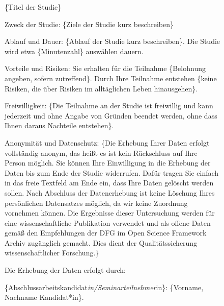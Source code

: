 \documentclass[
  letterpaper,
  DIV=11]{scrreprt}
\begin{document}
\begin{figure}

\hspace{0pt}\hspace{0pt}\{Titel der Studie\}

Zweck der Studie: \{Ziele der Studie kurz beschreiben\}

Ablauf und Dauer: \hspace{0pt}\{Ablauf der Studie kurz
beschreiben\}\hspace{0pt}. Die Studie wird etwa
\hspace{0pt}\{Minutenzahl\} auswählen\hspace{0pt} dauern.

Vorteile und Risiken: Sie erhalten für die Teilnahme
\hspace{0pt}\hspace{0pt}\{Belohnung angeben, sofern zutreffend\}.
\hspace{0pt}Durch Ihre Teilnahme entstehen \{keine Risiken, die über
Risiken im alltäglichen Leben hinausgehen\}.

Freiwilligkeit: \{Die Teilnahme an der Studie ist freiwillig und kann
jederzeit und ohne Angabe von Gründen beendet werden, ohne dass Ihnen
daraus Nachteile entstehen\}.

Anonymität und Datenschutz: \{Die Erhebung Ihrer Daten erfolgt
vollständig anonym, das heißt es ist kein Rückschluss auf Ihre Person
möglich. Sie können Ihre Einwilligung in die Erhebung der Daten bis zum
Ende der Studie widerrufen. Dafür tragen Sie einfach in das freie
Textfeld am Ende ein, dass Ihre Daten gelöscht werden sollen. Nach
Abschluss der Datenerhebung ist keine Löschung Ihres persönlichen
Datensatzes möglich, da wir keine Zuordnung vornehmen können.
\hspace{0pt}Die Ergebnisse dieser Untersuchung werden für eine
wissenschaftliche Publikation verwendet und als offene Daten gemäß den
Empfehlungen der DFG im Open Science Framework Archiv zugänglich
gemacht\hspace{0pt}. Dies dient der Qualitätssicherung
wissenschaftlicher Forschung.\}

Die Erhebung der Daten erfolgt durch:

\hspace{0pt}\hspace{0pt}\{Abschlussarbeitskandidat\emph{in/Seminarteilnehmer}in\}:\hspace{0pt}
\hspace{0pt}\{Vorname, Nachname Kandidat*in\}.\hspace{0pt}


\end{figure}
\end{document}
